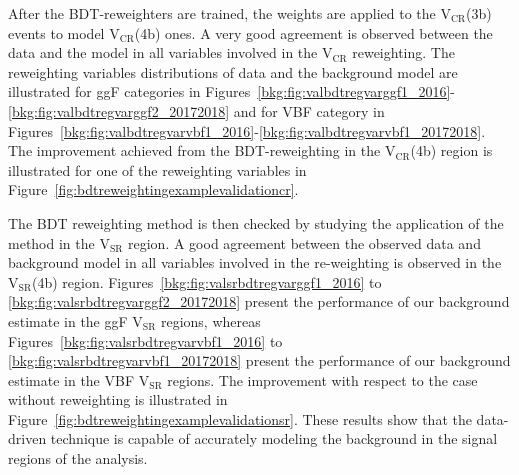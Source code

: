 After the BDT-reweighters are trained, the weights are applied to the $\mathrm{V_{CR}}$(3b) events to model $\mathrm{V_{CR}}$(4b) ones. A very good agreement is observed between the data and the model in all variables involved in the $\mathrm{V_{CR}}$ reweighting. The reweighting variables distributions of data and the background model are illustrated for ggF categories in Figures~\ref{bkg:fig:valbdtregvarggf1_2016}-\ref{bkg:fig:valbdtregvarggf2_20172018} and for VBF category in Figures~\ref{bkg:fig:valbdtregvarvbf1_2016}-\ref{bkg:fig:valbdtregvarvbf1_20172018}. The improvement achieved from the BDT-reweighting in the $\mathrm{V_{CR}}$(4b) region is illustrated for one of the reweighting variables in Figure~\ref{fig:bdtreweightingexamplevalidationcr}.

The BDT reweighting method is then checked by studying the application of the method in the $\mathrm{V_{SR}}$ region. A good agreement between the observed data and  background model in all variables involved in the re-weighting is observed in the $\mathrm{V_{SR}}$(4b) region. Figures~\ref{bkg:fig:valsrbdtregvarggf1_2016} to \ref{bkg:fig:valsrbdtregvarggf2_20172018} present the performance of our background estimate in the ggF $\mathrm{V_{SR}}$ regions, whereas Figures~\ref{bkg:fig:valsrbdtregvarvbf1_2016} to \ref{bkg:fig:valsrbdtregvarvbf1_20172018} present the performance of our background estimate in the VBF $\mathrm{V_{SR}}$ regions. The improvement with respect to the case without reweighting is illustrated in Figure~\ref{fig:bdtreweightingexamplevalidationsr}. These results show that the data-driven technique is capable of accurately modeling the background in the signal regions of the analysis.

